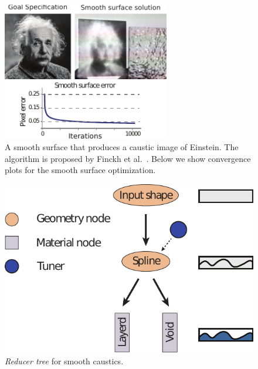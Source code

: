 \begin{figure}
\centering
\includegraphics[width=0.65\textwidth]{figure/spline.pdf}
\caption {A smooth surface that produces a caustic image of Einstein.
The algorithm is proposed by Finckh et al.~.
Below we show convergence plots for the smooth surface optimization.
}
\label{fig:spline}
\end{figure}

\begin{figure}
\centering
\includegraphics[scale=0.7]{figure/treeSpline.pdf}
\caption {\emph{Reducer tree} for smooth caustics.
}
\label{fig:treeSpline}
\end{figure}

